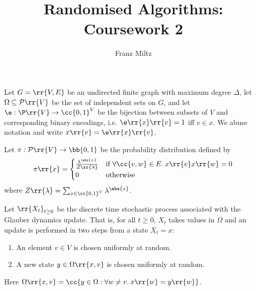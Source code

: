 \documentclass{article}
\title{Randomised Algorithms: Coursework 2}
\author{Franz Miltz}
\begin{document}
\maketitle

Let $G=\rr{V,E}$ be an undirected finite graph with maximum degree $\Delta$, let $\Omega\subseteq\mathcal P\rr{V}$
be the set of independent sets on $G$, and let $\e:\P\rr{V}\to \cc{0,1}^V$ be the bijection
between subsets of $V$ and corresponding binary encodings, i.e. $\e\rr{x}\rr{v}=1$ iff $v\in x$.
We abuse notation and write $x\rr{v}=\e\rr{x}\rr{v}$.

Let $\pi:\mathcal P\rr{V}\to\bb{0,1}$ be the probability distribution defined by
\begin{align*}
  \pi\rr{x}=
  \begin{cases}
    \frac{\lambda^{\abs{x}}}{Z\rr{\lambda}} &\text{if }\forall \cc{v,w}\in E.\:x\rr{v}x\rr{w}=0 \\
    0 &\text{otherwise}
  \end{cases}
\end{align*}
where $Z\rr{\lambda}=\sum_{x\in\cc{0,1}^V} \lambda^{\abs{x}}$.

Let $\rr{X_t}_{t\geq 0}$ be the discrete time stochastic process associated with the Glauber dynamics
update. That is, for all $t\geq 0$, $X_t$ takes values in $\Omega$ and an update is
performed in two steps from a state $X_t=x$:
\begin{enumerate}
  \item An element $v\in V$ is chosen uniformly at random.
  \item A new state $y\in\Omega\rr{x,v}$ is chosen uniformly at random.
\end{enumerate}
Here $\Omega\rr{x,v}=\cc{y\in\Omega : \forall w\neq v.\: x\rr{w}=y\rr{w}}$.
\end{document}
